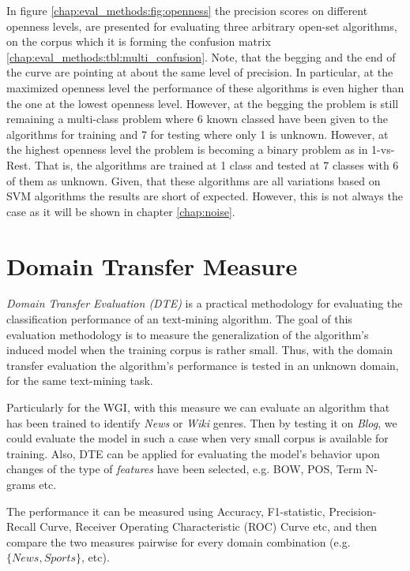 In figure \ref{chap:eval_methods:fig:openness} the precision scores on different openness levels, are presented for evaluating three arbitrary open-set algorithms, on the corpus which it is forming the confusion matrix \ref{chap:eval_methods:tbl:multi_confusion}. Note, that the begging and the end of the curve are pointing at about the same level of precision. In particular, at the maximized openness level the performance of these algorithms is even higher than the one at the lowest openness level. However, at the begging the problem is still remaining a multi-class problem where 6 known classed have been given to the algorithms for training and 7 for testing where only 1 is unknown. However, at the highest openness level the problem is becoming a binary problem as in 1-vs-Rest. That is, the algorithms are trained at 1 class and tested at 7 classes with 6 of them as unknown. Given, that these algorithms are all variations based on SVM algorithms the results are short of expected. However, this is not always the case as it will be shown in chapter \ref{chap:noise}.


\section{Domain Transfer Measure}\label{chap:eval_methods:sec:domain_transfer_measure}

\textit{Domain Transfer Evaluation (DTE)} is a practical methodology for evaluating the classification performance of an text-mining algorithm. The goal of this evaluation methodology is to measure the generalization of the algorithm's induced model when the training corpus is rather small. Thus, with the domain transfer evaluation the algorithm's performance is tested in an unknown domain, for the same text-mining task. 

Particularly for the WGI, with this measure we can evaluate an algorithm that has been trained to identify \textit{News} or \textit{Wiki} genres. Then by testing it on \textit{Blog}, we could evaluate the model in such a case when very small corpus is available for training. Also, DTE can be applied for evaluating the model's behavior upon changes of the type of \textit{features} have been selected, e.g. BOW, POS, Term N-grams etc. 

The performance it can be measured using Accuracy, F1-statistic, Precision-Recall Curve, Receiver Operating Characteristic (ROC) Curve etc, and then compare the two measures pairwise for every domain combination (e.g. $\{News, Sports\}$, etc).

